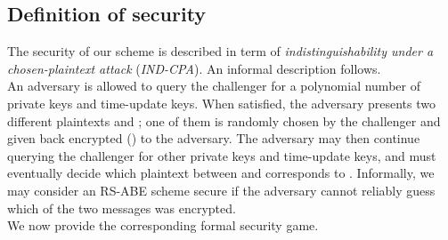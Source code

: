 \documentclass[a4paper,10pt]{article}
\begin{document}
	\subsection{Definition of security}
	\label{security.sec}
	The security of our scheme is described in term of \emph{indistinguishability under a chosen-plaintext attack} (\emph{IND-CPA}).
	An informal description follows.\\
	An adversary is allowed to query the challenger for a polynomial number of private keys and time-update keys. When satisfied, the adversary presents two different plaintexts  and ; one of them is randomly chosen by the challenger and given back encrypted () to the adversary. The adversary may then continue querying the challenger for other private keys and time-update keys, and must eventually decide which plaintext between  and  corresponds to . Informally, we may consider an RS-ABE scheme secure if the adversary cannot reliably guess which of the two messages was encrypted.\\
	We now provide the corresponding formal security game.
\end{document}
